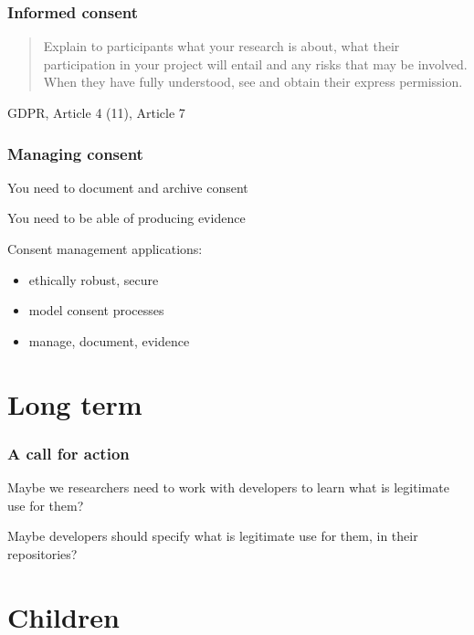 \documentclass[17pt,aspectratio=169,hyperref={pdfusetitle,colorlinks,allcolors=olive}]{beamer}
\begin{document}
\begin{frame}[fragile]
  \frametitle{Informed consent}

  \begin{quote}
  Explain to participants what your research is about, what their participation in your project will entail and any risks that may be involved. When they have fully understood, see and obtain their express permission.
  \end{quote}

  \begin{flushright}
  GDPR, Article 4 (11), Article 7
  \end{flushright}
\end{frame}

\begin{frame}[fragile]
  \frametitle{Managing consent}

  You need to document and archive consent

  You need to be able of producing evidence

  Consent management applications:

  \begin{itemize}
  \item ethically robust, secure
  \item model consent processes
  \item manage, document, evidence
  \end{itemize}
\end{frame}

\section{Long term}

\begin{frame}[fragile]
  \frametitle{A call for action}

  Maybe we researchers need to work with developers to learn what is legitimate use for them?

  Maybe developers should specify what is legitimate use for them, in their repositories?
  
\end{frame}

\section{Children}
\end{document}

